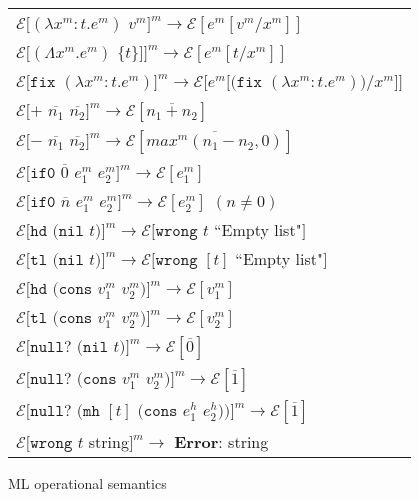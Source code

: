 \begin{figure}[p]
\centering
\begin{tabular}{l}

$\mathscr{E}[(\lambda x^m:t.e^m)$ $v^m]^m\rightarrow\mathscr{E}[e^m[v^m/x^m]]$ \\

$\mathscr{E}[(\Lambda x^m.e^m)$ $\lbrace t\rbrace]]^m\rightarrow\mathscr{E}[e^m[t/x^m]]$ \\

$\mathscr{E}[\mathtt{fix}$ $(\lambda x^m:t.e^m)]^m\rightarrow\mathscr{E}[e^m[(\mathtt{fix}$ $(\lambda x^m:t.e^m))/x^m]]$ \\

$\mathscr{E}[+$ $\overline{n_{1}}$ $\overline{n_{2}}]^m\rightarrow\mathscr{E}[\overline{n_{1}+n_{2}}]$ \\

$\mathscr{E}[-$ $\overline{n_{1}}$ $\overline{n_{2}}]^m\rightarrow\mathscr{E}[\overline{max^m(n_{1}-n_{2},0)}]$ \\

$\mathscr{E}[\mathtt{if0}$ $\overline{0}$ $e^m_1$ $e^m_2]^m\rightarrow\mathscr{E}[e^m_1]$ \\

$\mathscr{E}[\mathtt{if0}$ $\overline{n}$ $e^m_1$ $e^m_2]^m\rightarrow\mathscr{E}[e^m_2]$ $(n\neq0)$ \\

$\mathscr{E}[\mathtt{hd}$ $(\mathtt{nil}$ $t)]^m\rightarrow\mathscr{E}[\mathtt{wrong}$ $t$ ``Empty list"$]$ \\

$\mathscr{E}[\mathtt{tl}$ $(\mathtt{nil}$ $t)]^m\rightarrow\mathscr{E}[\mathtt{wrong}$ $[t]$ ``Empty list"$]$ \\

$\mathscr{E}[\mathtt{hd}$ $(\mathtt{cons}$ $v^m_1$ $v^m_2)]^m\rightarrow\mathscr{E}[v^m_1]$ \\

$\mathscr{E}[\mathtt{tl}$ $(\mathtt{cons}$ $v^m_1$ $v^m_2)]^m\rightarrow\mathscr{E}[v^m_2]$ \\

$\mathscr{E}[\mathtt{null?}$ $(\mathtt{nil}$ $t)]^m\rightarrow\mathscr{E}[\overline{0}]$ \\

$\mathscr{E}[\mathtt{null?}$ $(\mathtt{cons}$ $v^m_1$ $v^m_2)]^m\rightarrow\mathscr{E}[\overline{1}]$ \\

$\mathscr{E}[\mathtt{null?}$ $(\mathtt{mh}$ $[t]$ $(\mathtt{cons}$ $e^h_1$ $e^h_2))]^m\rightarrow\mathscr{E}[\overline{1}]$ \\

$\mathscr{E}[\mathtt{wrong}$ $t$ string$]^m\rightarrow$ \textbf{Error}: string

\end{tabular}
\caption{ML operational semantics}
\label{mos}
\end{figure}